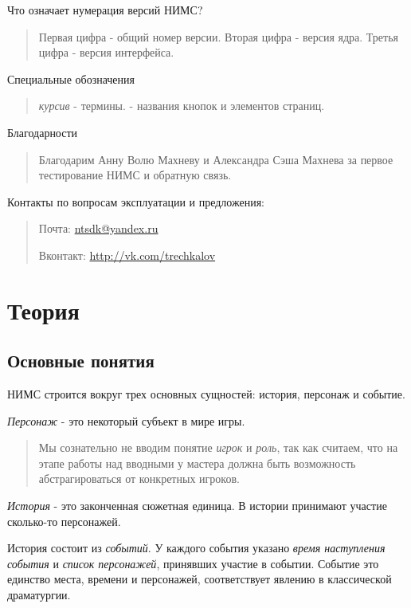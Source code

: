\documentclass[a4paper,oneside,10pt,russian]{sphinxmanual}
\begin{document}
Что означает нумерация версий НИМС?
\begin{quote}

Первая цифра - общий номер версии. Вторая цифра - версия ядра. Третья цифра - версия интерфейса.
\end{quote}

Специальные обозначения
\begin{quote}

\emph{курсив} - термины.  - названия кнопок и элементов страниц.
\end{quote}

Благодарности
\begin{quote}

Благодарим Анну Волю Махневу и Александра Сэша Махнева за первое тестирование НИМС и обратную связь.
\end{quote}

Контакты по вопросам эксплуатации и предложения:
\begin{quote}

Почта: \href{mailto:ntsdk@yandex.ru}{ntsdk@yandex.ru}

Вконтакт: \href{http://vk.com/trechkalov}{http://vk.com/trechkalov}
\end{quote}


\chapter{Теория}
\label{theory::doc}\label{theory:id1}

\section{Основные понятия}
\label{theory:id2}
НИМС строится вокруг трех основных сущностей: история, персонаж и событие.

\emph{Персонаж} - это некоторый субъект в мире игры.
\begin{quote}

Мы сознательно не вводим понятие \emph{игрок} и \emph{роль}, так как считаем, что на этапе работы над вводными у мастера должна быть возможность абстрагироваться от конкретных игроков.
\end{quote}

\emph{История} - это законченная сюжетная единица. В истории принимают участие сколько-то персонажей.

История состоит из \emph{событий}. У каждого события указано \emph{время наступления события} и \emph{список персонажей}, принявших участие в событии. Событие это единство места, времени и персонажей, соответствует явлению в классической драматургии.
\end{document}
